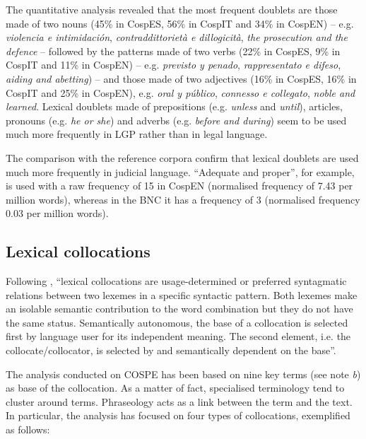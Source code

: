 \documentclass[output=paper]{LSP/langsci}
\begin{document}
The quantitative analysis revealed that the most frequent doublets are those made of two nouns (45\% in CospES, 56\% in CospIT and 34\% in CospEN) – e.g. \textit{violencia e intimidación}, \textit{contraddittorietà e dillogicità}, \textit{the prosecution and the defence} – followed by the patterns made of two verbs (22\% in CospES, 9\% in CospIT and 11\% in CospEN) – e.g. \textit{previsto y penado}, \textit{rappresentato e difeso}, \textit{aiding and abetting}) – and those made of two adjectives (16\% in CospES, 16\% in CospIT and 25\% in CospEN), e.g. \textit{oral y público}, \textit{connesso e collegato}, \textit{noble and learned}. Lexical doublets made of prepositions (e.g. \textit{unless} and \textit{until}), articles, pronouns (e.g. \textit{he or she}) and adverbs (e.g. \textit{before and during}) seem to be used much more frequently in LGP rather than in legal language.

The comparison with the reference corpora confirm that lexical doublets are used much more frequently in judicial language. “Adequate and proper”, for example, is used with a raw frequency of 15 in CospEN (normalised frequency of 7.43 per million words), whereas in the BNC it has a frequency of 3 (normalised frequency 0.03 per million words).

\subsection{Lexical collocations}
Following \citet[43]{Granger2008}, “lexical collocations are usage-determined or preferred syntagmatic relations between two lexemes in a specific syntactic pattern. Both lexemes make an isolable semantic contribution to the word combination but they do not have the same status. Semantically autonomous, the base of a collocation is selected first by language user for its independent meaning. The second element, i.e. the collocate/collocator, is selected by and semantically dependent on the base”.

The analysis conducted on COSPE has been based on nine key terms (see note \textit{b}) as base of the collocation. As a matter of fact, specialised terminology tend to cluster around terms. Phraseology acts as a link between the term and the text. In particular, the analysis has focused on four types of collocations, exemplified as follows:
\end{document}
